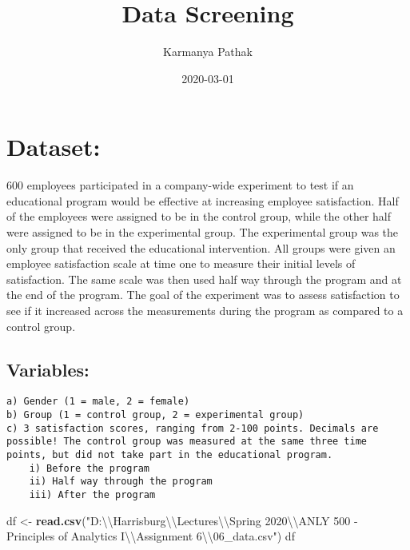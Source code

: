 \documentclass[
]{article}
\title{Data Screening}
\author{Karmanya Pathak}
\date{2020-03-01}
\newenvironment{Shaded}{\begin{snugshade}}{\end{snugshade}}
\newcommand{\CharTok}[1]{\textcolor[rgb]{0.31,0.60,0.02}{#1}}
\newcommand{\KeywordTok}[1]{\textcolor[rgb]{0.13,0.29,0.53}{\textbf{#1}}}
\newcommand{\NormalTok}[1]{#1}
\newcommand{\StringTok}[1]{\textcolor[rgb]{0.31,0.60,0.02}{#1}}
\begin{document}
\maketitle

\hypertarget{dataset}{%
\section{Dataset:}\label{dataset}}

600 employees participated in a company-wide experiment to test if an
educational program would be effective at increasing employee
satisfaction. Half of the employees were assigned to be in the control
group, while the other half were assigned to be in the experimental
group. The experimental group was the only group that received the
educational intervention. All groups were given an employee satisfaction
scale at time one to measure their initial levels of satisfaction. The
same scale was then used half way through the program and at the end of
the program. The goal of the experiment was to assess satisfaction to
see if it increased across the measurements during the program as
compared to a control group.

\hypertarget{variables}{%
\subsection{Variables:}\label{variables}}

\begin{verbatim}
a) Gender (1 = male, 2 = female)
b) Group (1 = control group, 2 = experimental group)
c) 3 satisfaction scores, ranging from 2-100 points. Decimals are possible! The control group was measured at the same three time points, but did not take part in the educational program. 
    i) Before the program
    ii) Half way through the program 
    iii) After the program 
\end{verbatim}

\begin{Shaded}
\begin{Highlighting}[]
\NormalTok{df <-}\StringTok{ }\KeywordTok{read.csv}\NormalTok{(}\StringTok{"D:}\CharTok{\textbackslash{}\textbackslash{}}\StringTok{Harrisburg}\CharTok{\textbackslash{}\textbackslash{}}\StringTok{Lectures}\CharTok{\textbackslash{}\textbackslash{}}\StringTok{Spring 2020}\CharTok{\textbackslash{}\textbackslash{}}\StringTok{ANLY 500 - Principles of Analytics I}\CharTok{\textbackslash{}\textbackslash{}}\StringTok{Assignment 6}\CharTok{\textbackslash{}\textbackslash{}}\StringTok{06_data.csv"}\NormalTok{)}
\NormalTok{df}
\end{Highlighting}
\end{Shaded}
\end{document}
